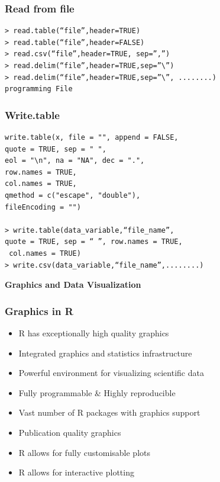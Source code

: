 \documentclass[12pt]{beamer}
\begin{document}
\begin{frame}[fragile]
\frametitle{Read from file}
\begin{verbatim}
> read.table(“file”,header=TRUE)
> read.table(“file”,header=FALSE)
> read.csv(“file”,header=TRUE, sep=”,”)
> read.delim(“file”,header=TRUE,sep=”\”)
> read.delim(“file”,header=TRUE,sep=”\”, ........)
programming File
\end{verbatim}
\end{frame}

\begin{frame}[fragile]
\frametitle{Write.table}
\begin{verbatim}
write.table(x, file = "", append = FALSE, 
quote = TRUE, sep = " ",
eol = "\n", na = "NA", dec = ".", 
row.names = TRUE,
col.names = TRUE, 
qmethod = c("escape", "double"),
fileEncoding = "")

> write.table(data_variable,“file_name”,
quote = TRUE, sep = “ ”, row.names = TRUE,
 col.names = TRUE)
> write.csv(data_variable,“file_name”,........)
\end{verbatim}
\end{frame}

\begin{frame}
\begin{center}
	\begin{block}{}
		\textbf{\LARGE \textcolor{idrbt_dark_blue}{Graphics and Data Visualization}}
\end{block}\end{center}
\end{frame}

\begin{frame}
	\frametitle{Graphics in R}
\begin{itemize}
	\item R has exceptionally high quality graphics
		\item Integrated graphics and statistics infrastructure
		\item Powerful environment for visualizing scientific data
		\item Fully programmable \& Highly reproducible
		\item Vast number of R packages with graphics support
		\item Publication quality graphics
		\item R allows for fully customisable plots
		\item R allows for interactive plotting
\end{itemize}
\end{frame}
\end{document}
